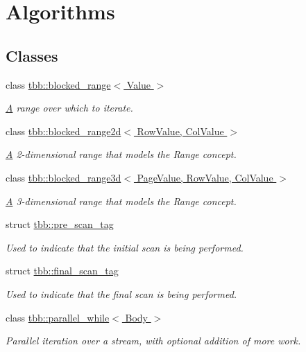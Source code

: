 \hypertarget{group__algorithms}{}\section{Algorithms}
\label{group__algorithms}
\subsection*{Classes}
\begin{DoxyCompactItemize}
\item 
class \hyperlink{classtbb_1_1blocked__range}{tbb\+::blocked\+\_\+range$<$ Value $>$}
\begin{DoxyCompactList}\small\item\em \hyperlink{structA}{A} range over which to iterate. \end{DoxyCompactList}\item 
class \hyperlink{classtbb_1_1blocked__range2d}{tbb\+::blocked\+\_\+range2d$<$ Row\+Value, Col\+Value $>$}
\begin{DoxyCompactList}\small\item\em \hyperlink{structA}{A} 2-\/dimensional range that models the Range concept. \end{DoxyCompactList}\item 
class \hyperlink{classtbb_1_1blocked__range3d}{tbb\+::blocked\+\_\+range3d$<$ Page\+Value, Row\+Value, Col\+Value $>$}
\begin{DoxyCompactList}\small\item\em \hyperlink{structA}{A} 3-\/dimensional range that models the Range concept. \end{DoxyCompactList}\item 
struct \hyperlink{structtbb_1_1pre__scan__tag}{tbb\+::pre\+\_\+scan\+\_\+tag}
\begin{DoxyCompactList}\small\item\em Used to indicate that the initial scan is being performed. \end{DoxyCompactList}\item 
struct \hyperlink{structtbb_1_1final__scan__tag}{tbb\+::final\+\_\+scan\+\_\+tag}
\begin{DoxyCompactList}\small\item\em Used to indicate that the final scan is being performed. \end{DoxyCompactList}\item 
class \hyperlink{classtbb_1_1parallel__while}{tbb\+::parallel\+\_\+while$<$ Body $>$}
\begin{DoxyCompactList}\small\item\em Parallel iteration over a stream, with optional addition of more work. \end{DoxyCompactList}\item 

\end{DoxyCompactItemize}
